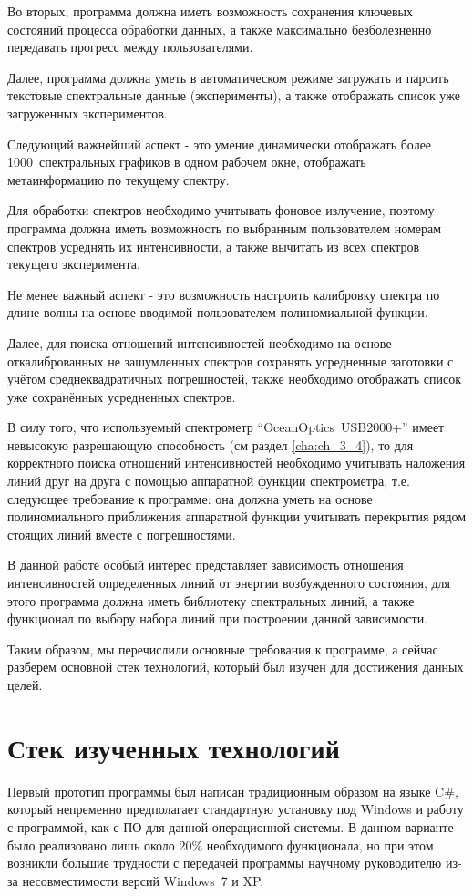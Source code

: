 Во вторых, программа должна иметь возможность сохранения ключевых состояний процесса обработки данных,
а также максимально безболезненно передавать прогресс между пользователями.

Далее, программа должна уметь в автоматическом режиме загружать и парсить текстовые спектральные данные
(эксперименты), а также отображать список уже загруженных экспериментов.

Следующий важнейший аспект - это умение динамически отображать более 1000~спектральных графиков в одном
рабочем окне, отображать метаинформацию по текущему спектру.

Для обработки спектров необходимо учитывать фоновое излучение, поэтому программа должна иметь возможность по
выбранным пользователем номерам спектров усреднять их интенсивности, а также вычитать из всех спектров текущего эксперимента.

Не менее важный аспект - это возможность настроить калибровку спектра по длине волны на основе вводимой пользователем полиномиальной функции.

Далее, для поиска отношений интенсивностей необходимо на основе откалиброванных не зашумленных спектров сохранять
усредненные заготовки с учётом среднеквадратичных погрешностей, также необходимо отображать
список уже сохранённых усредненных спектров.

В силу того, что используемый спектрометр  “OceanOptics~USB2000+” имеет невысокую разрешающую
способность (см раздел \ref{cha:ch_3_4}), то для корректного поиска отношений интенсивностей
необходимо учитывать наложения линий друг на друга с помощью аппаратной функции спектрометра,
т.е. следующее требование к программе: она должна уметь на основе полиномиального приближения аппаратной
функции учитывать перекрытия рядом стоящих линий вместе с погрешностями.

В данной работе особый интерес представляет зависимость отношения интенсивностей определенных линий от энергии
возбужденного состояния, для этого программа должна иметь библиотеку спектральных линий, а также функционал
по выбору набора линий при построении данной зависимости.

Таким образом, мы перечислили основные требования к программе, а сейчас разберем основной стек технологий,
который был изучен для достижения данных целей.

\section{Стек изученных технологий}
Первый прототип программы был написан традиционным образом на языке C\#, который непременно предполагает
стандартную установку под Windows и работу с программой, как с ПО для данной операционной системы.
В данном варианте было реализовано лишь около 20\% необходимого функционала, но при этом возникли большие трудности
с передачей программы научному руководителю из-за несовместимости версий Windows~7 и XP.

